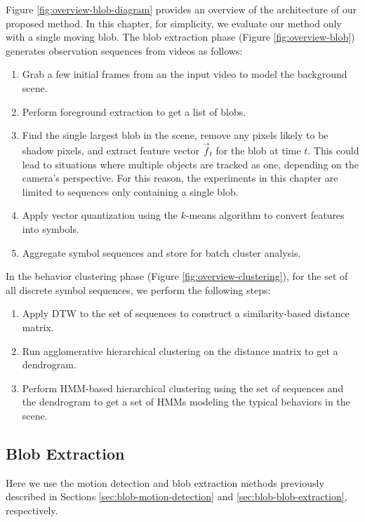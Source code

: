 Figure \ref{fig:overview-blob-diagram} provides an overview of the
architecture of our proposed method. In this chapter, for simplicity, 
we evaluate our method only with a single moving blob. 
The blob extraction phase
(Figure \ref{fig:overview-blob}) generates observation sequences from
videos as follows:
\begin{enumerate}
  \item Grab a few initial frames from an the input video to model the
    background scene.
  \item Perform foreground extraction to get a list of blobs.
  \item Find the single largest blob in the scene, remove any pixels
    likely to be shadow pixels, and extract feature vector $\vec{f}_t$
    for the blob at time $t$.  
    This could lead to situations 
    where multiple objects are tracked as one, depending on the camera's  
    perspective. For this reason, the experiments in this chapter are 
    limited to sequences only containing a single blob.
  \item Apply vector quantization using the $k$-means algorithm to
    convert features into symbols.
  \item Aggregate symbol sequences and store for batch cluster
    analysis.
\end{enumerate}
In the behavior clustering phase
(Figure \ref{fig:overview-clustering}), for the set of all discrete
symbol sequences, we perform the following steps:

\begin{enumerate}
  \item Apply DTW to the set of sequences to construct a
    similarity-based distance matrix.
  \item Run agglomerative hierarchical clustering on the distance
    matrix to get a dendrogram.
  \item Perform HMM-based hierarchical clustering using the set of
    sequences and the dendrogram to get a set of HMMs modeling the
    typical behaviors in the scene.
\end{enumerate}

\subsection{Blob Extraction}
\label{sec:clustering-blob-extraction}

Here we use the motion detection and blob extraction methods
previously described in Sections \ref{sec:blob-motion-detection}
and \ref{sec:blob-blob-extraction}, respectively.

